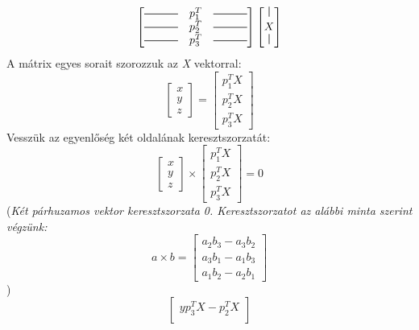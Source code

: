 \documentclass[12pt]{report}
\newcommand*{\xdash}[1][3em]{\rule[0.5ex]{#1}{0.55pt}}
\newcommand*{\ydash}[1][0.9em]{\rule{0.55pt}{#1}}
\begin{document}
\begin{enumerate}
\[                        \begin{bmatrix}
                        \xdash & p_{1}^T & \xdash \\
                        \xdash & p_{2}^T & \xdash \\
                        \xdash & p_{3}^T & \xdash
                        \end{bmatrix}
                        \begin{bmatrix}\ydash\\X\\\ydash\end{bmatrix}\]
                        A mátrix egyes sorait szorozzuk az \textit{X} vektorral:
                        \[\begin{bmatrix}x\\y\\z\end{bmatrix} =
                        \begin{bmatrix}
                        p_{1}^TX\\
                        p_{2}^TX\\
                        p_{3}^TX
                        \end{bmatrix}\]
                        Vesszük az egyenlőség két oldalának keresztszorzatát:
                        \[\begin{bmatrix}x\\y\\z\end{bmatrix} \times \begin{bmatrix}
                        p_{1}^TX\\
                        p_{2}^TX\\
                        p_{3}^TX
                        \end{bmatrix} = 0\]
                        (\textit{Két párhuzamos vektor keresztszorzata 0. Keresztszorzatot az alábbi minta szerint végzünk:
                        \[a \times b = \begin{bmatrix} 
                            a_2 b_3 - a_3 b_2 \\ 
                            a_3 b_1 - a_1 b_3 \\ 
                            a_1 b_2 - a_2 b_1 
                            \end{bmatrix}
                        \]})
                        \[\begin{bmatrix}
                        yp_3^TX - p_2^TX \\

\end{bmatrix}\]
\end{enumerate}
\end{document}
